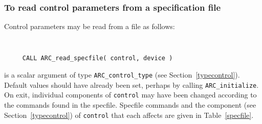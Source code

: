 \documentclass{galahad}
\newcommand{\packagename}{ARC}
\begin{document}
\subsubsection{To read control parameters from a specification file}
\label{readspec}

Control parameters may be read from a file as follows:
\hskip0.5in
\def\baselinestretch{0.8} {\tt
\begin{verbatim}
     CALL ARC_read_specfile( control, device )
\end{verbatim}
}
\def\baselinestretch{1.0}

\begin{description}
 is a scalar \intentinout argument of type
{\tt \packagename\_control\_type}
(see Section~\ref{typecontrol}).
Default values should have already been set, perhaps by calling
{\tt \packagename\_initialize}.
On exit, individual components of {\tt control} may have been changed
according to the commands found in the specfile. Specfile commands and
the component (see Section~\ref{typecontrol}) of {\tt control}
that each affects are given in Table~\ref{specfile}.


\end{description}
\end{document}
